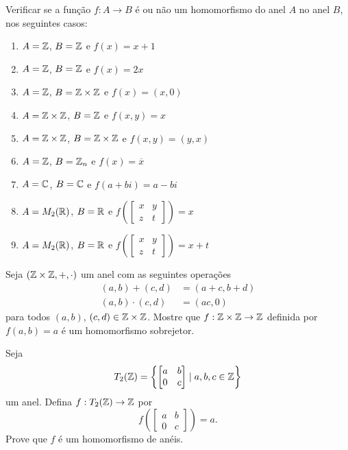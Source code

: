 \documentclass[12pt]{exam}
\begin{document}
 Verificar se a função $f : A \to B$ é ou não um homomorfismo do anel $A$ no anel $B$, nos seguintes casos:
\begin{enumerate}[label=({\alph*})]
    \item $A = \mathbb{Z}$, $B = \mathbb{Z}$ e $f(x) = x + 1$

    \item $A = \mathbb{Z}$, $B = \mathbb{Z}$ e $f(x) = 2x$

    \item $A = \mathbb{Z}$, $B = \mathbb{Z} \times \mathbb{Z}$ e $f(x) = (x, 0)$

    \item $A = \mathbb{Z} \times \mathbb{Z}$, $B = \mathbb{Z}$ e $f(x,y) = x$

    \item $A = \mathbb{Z} \times \mathbb{Z}$, $B = \mathbb{Z} \times \mathbb{Z}$ e $f(x,y) = (y,x)$

    \item $A = \mathbb{Z}$, $B = \mathbb{Z}_n$ e $f(x) = \overline{x}$

    \item $A = \mathbb{C}$, $B = \mathbb{C}$ e $f(a + bi) = a - bi$

    \item $A = M_2(\mathbb{R})$, $B = \mathbb{R}$ e $f\left(\begin{bmatrix}
        x & y\\z & t
    \end{bmatrix}\right) = x$

    \item $A = M_2(\mathbb{R})$, $B = \mathbb{R}$ e $f\left(\begin{bmatrix}
        x & y\\z & t
    \end{bmatrix}\right) = x + t$
\end{enumerate}

\vspace{.3cm}

\questao{} Seja $(\mathbb{Z}\times\mathbb{Z}, +, \cdot)$ um anel com as seguintes operações
\begin{align*}
    (a, b) + (c, d) &= (a + c, b + d)\\
    (a, b)\cdot (c, d) &= (ac, 0)
\end{align*}
para todos $(a, b)$, $(c, d) \in \mathbb{Z}\times\mathbb{Z}$.
Mostre que $ f : \mathbb{Z}\times\mathbb{Z} \to \mathbb{Z}$ definida por $f(a, b) = a$ é um homomorfismo sobrejetor.

\vspace{.3cm}

\questao{} Seja
\[
T_2(\mathbb{Z}) = \left\{\begin{bmatrix}a & b\\ 0 & c\end{bmatrix} \mid a, b, c \in \mathbb{Z}\right\}
\]
um anel. Defina $f : T_2(\mathbb{Z}) \to \mathbb{Z}$ por
\[
f\left(\begin{bmatrix}a & b\\ 0 & c\end{bmatrix}\right) = a.
\]
Prove que $f$ é um homomorfismo de anéis.
\end{document}
